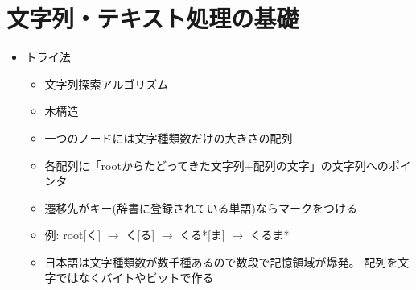 \documentclass[a4j,11pt]{jsarticle}
\begin{document}
\setcounter{section}{1}
\section{文字列・テキスト処理の基礎}
\begin{itemize}
 \item トライ法
       \begin{itemize}
	\item 文字列探索アルゴリズム
	\item 木構造
	\item 一つのノードには文字種類数だけの大きさの配列
	\item 各配列に「rootからたどってきた文字列$+$配列の文字」の文字列へのポインタ
	\item 遷移先がキー(辞書に登録されている単語)ならマークをつける
	\item 例: root[く] $\rightarrow$ く[る] $\rightarrow$ くる*[ま] $\rightarrow$ くるま*
	\item 日本語は文字種類数が数千種あるので数段で記憶領域が爆発。
	      配列を文字ではなくバイトやビットで作る
       \end{itemize}
\end{itemize}
\end{document}

